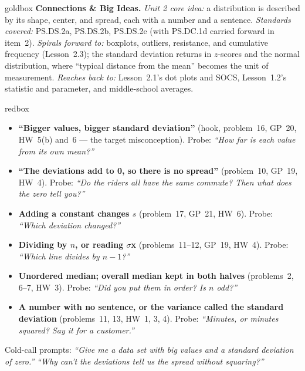 \documentclass[10pt]{article}
\begin{document}
\begin{skillbox}{goldbox}
\textbf{Connections \& Big Ideas.} \textit{Unit 2 core idea:} a distribution is described by its
shape, center, and spread, each with a number and a sentence. \textit{Standards covered:}
PS.DS.2a, PS.DS.2b, PS.DS.2e (with PS.DC.1d carried forward in item~2). \textit{Spirals forward
to:} boxplots, outliers, resistance, and cumulative frequency (Lesson~2.3); the standard deviation
returns in $z$-scores and the normal distribution, where ``typical distance from the mean'' becomes
the unit of measurement. \textit{Reaches back to:} Lesson~2.1's dot plots and SOCS, Lesson~1.2's
statistic and parameter, and middle-school averages.
\end{skillbox}

\boxguard
\begin{skillbox}{redbox}
\begin{itemize}[leftmargin=1.2em, nosep]
  \item \textbf{``Bigger values, bigger standard deviation''} (hook, problem~16, GP~20, HW~5(b)
        and~6 --- the target misconception). Probe: \emph{``How far is each value from its
        \emph{own} mean?''}
  \item \textbf{``The deviations add to 0, so there is no spread''} (problem~10, GP~19, HW~4).
        Probe: \emph{``Do the riders all have the same commute? Then what does the zero
        tell you?''}
  \item \textbf{Adding a constant changes $s$} (problem~17, GP~21, HW~6). Probe: \emph{``Which
        deviation changed?''}
  \item \textbf{Dividing by $n$, or reading $\sigma$x} (problems~11--12, GP~19, HW~4). Probe:
        \emph{``Which line divides by $n - 1$?''}
  \item \textbf{Unordered median; overall median kept in both halves} (problems~2, 6--7,
        HW~3). Probe: \emph{``Did you put them in order? Is $n$ odd?''}
  \item \textbf{A number with no sentence, or the variance called the standard deviation}
        (problems~11, 13, HW~1, 3, 4). Probe: \emph{``Minutes, or minutes squared? Say it for
        a customer.''}
\end{itemize}
Cold-call prompts: \emph{``Give me a data set with big values and a standard deviation of
zero.''} \quad \emph{``Why can't the deviations tell us the spread without squaring?''}
\end{skillbox}
\end{document}
